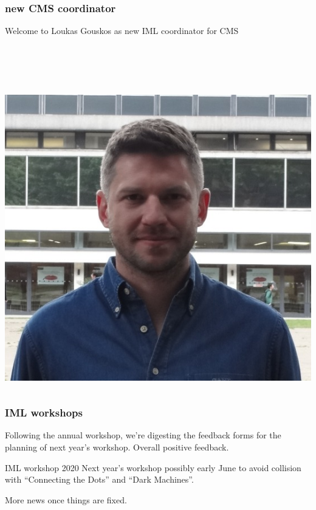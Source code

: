 \maketitle

\begin{frame}
  \frametitle{new CMS coordinator}
  Welcome to Loukas Gouskos as new IML coordinator for CMS

  {~}

  {~}

  \begin{columns}
    \begin{column}{.4\textwidth}
      \includegraphics[width=\textwidth]{./loukas.png}
    \end{column}
  \end{columns}
\end{frame}

\begin{frame}
  \frametitle{IML workshops}
  Following the annual workshop, we're digesting the feedback forms for the planning of next year's workshop. Overall positive feedback.

  \begin{block}{IML workshop 2020}
    Next year's workshop possibly early June to avoid collision with ``Connecting the Dots'' and ``Dark Machines''.

    More news once things are fixed.
  \end{block}
\end{frame}

